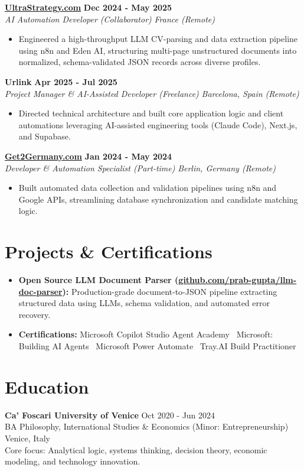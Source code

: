 \documentclass[a4paper,10pt]{article}
\newcommand{\role}[4]{%
  \textbf{#1} \hfill \textbf{#2}\\[1pt]%
  \textit{#3} \hfill \textit{#4}\\[2pt]%
}
\begin{document}
\role{\href{https://ultrastrategy.com}{UltraStrategy.com}}{Dec 2024 - May 2025}{AI Automation Developer (Collaborator)}{France (Remote)}
\begin{itemize}
  \item Engineered a high-throughput LLM CV-parsing and data extraction pipeline using n8n and Eden AI, structuring multi-page unstructured documents into normalized, schema-validated JSON records across diverse profiles.
\end{itemize}

\role{Urlink}{Apr 2025 - Jul 2025}{Project Manager \& AI-Assisted Developer (Freelance)}{Barcelona, Spain (Remote)}
\begin{itemize}
  \item Directed technical architecture and built core application logic and client automations leveraging AI-assisted engineering tools (Claude Code), Next.js, and Supabase.
\end{itemize}

\role{\href{https://get2germany.com}{Get2Germany.com}}{Jan 2024 - May 2024}{Developer \& Automation Specialist (Part-time)}{Berlin, Germany (Remote)}
\begin{itemize}
  \item Built automated data collection and validation pipelines using n8n and Google APIs, streamlining database synchronization and candidate matching logic.
\end{itemize}

\section{Projects \& Certifications}
\begin{itemize}
  \item \textbf{Open Source LLM Document Parser (\href{https://github.com/prab-gupta/llm-doc-parser}{github.com/prab-gupta/llm-doc-parser}):} Production-grade document-to-JSON pipeline extracting structured data using LLMs, schema validation, and automated error recovery.
  \item \textbf{Certifications:} Microsoft Copilot Studio Agent Academy \textbullet\ Microsoft: Building AI Agents \textbullet\ Microsoft Power Automate \textbullet\ Tray.AI Build Practitioner
\end{itemize}

\section{Education}
\textbf{Ca' Foscari University of Venice} \hfill Oct 2020 - Jun 2024\\
BA Philosophy, International Studies \& Economics (Minor: Entrepreneurship) \hfill Venice, Italy\\
{\footnotesize Core focus: Analytical logic, systems thinking, decision theory, economic modeling, and technology innovation.}
\end{document}
